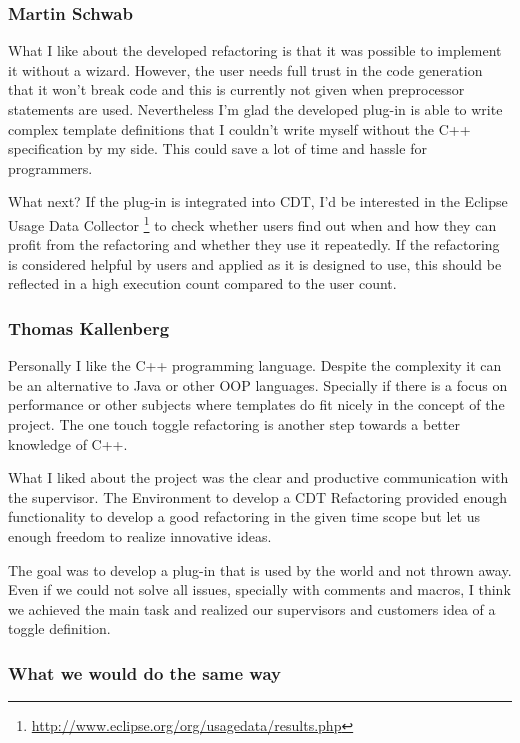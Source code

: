 \subsubsection{Martin Schwab}

What I like about the developed refactoring is that it was possible to
implement 
it without a wizard. However, the user needs full trust in the code generation 
that it won't break code and this is currently not given when preprocessor 
statements are used. Nevertheless I'm glad the developed plug-in is able to
write 
complex template definitions that I couldn't write myself without the C++ 
specification by my side. This could save a lot of time and hassle for 
programmers.

What next? If the plug-in is integrated into CDT, I'd be interested in the 
Eclipse Usage Data Collector
\footnote{\url{http://www.eclipse.org/org/usagedata/results.php}} to check 
whether users find out when and how they can profit from the refactoring and 
whether they use it repeatedly. If the refactoring is considered helpful by 
users and applied as it is designed to use, this should be reflected in a high 
execution count compared to the user count.

\subsubsection{Thomas Kallenberg}

Personally I like the C++ programming language. Despite the complexity it can
be an alternative to Java or other OOP languages. Specially if there is a focus
on performance or other subjects where templates do fit nicely in the concept
of the project.
The one touch toggle refactoring is another step towards a better knowledge of
C++.

What I liked about the project was the clear and productive communication with
the supervisor. The Environment to develop a CDT Refactoring provided enough
functionality to develop a good refactoring in the given time scope but let us
enough freedom to realize innovative ideas.

The goal was to develop a plug-in that is used by the world and not thrown away.
Even if we could not solve all issues, specially with comments and macros, I
think we achieved the main task and realized our supervisors and customers 
idea of a toggle definition.

\subsubsection{What we would do the same way}

